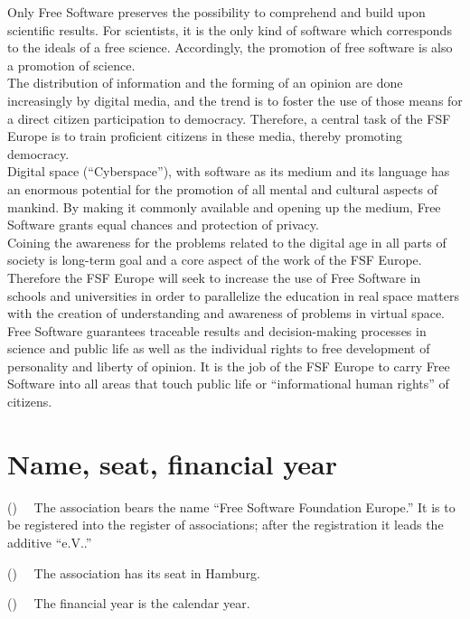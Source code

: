 \documentclass[a4wide,12pt]{article}
\newcounter{absatz}[section]
\newcommand{\A}{\par\vspace{1ex}
                \stepcounter{absatz}\noindent(\arabic{absatz})~~}
\begin{document}
Only Free Software preserves the possibility to comprehend and build
upon scientific results. For scientists, it is the only kind of
software which corresponds to the ideals of a free
science. Accordingly, the promotion of free software is also a
promotion of science.\\

The distribution of information and the forming of an opinion are done
increasingly by digital media, and the trend is to foster the use of
those means for a direct citizen participation to
democracy. Therefore, a central task of the FSF Europe is to train
proficient citizens in these media, thereby promoting democracy.\\

Digital space (``Cyberspace''), with software as its medium and its
language has an enormous potential for the promotion of all mental and
cultural aspects of mankind. By making it commonly available and
opening up the medium, Free Software grants equal chances and
protection of privacy.\\

Coining the awareness for the problems related to the digital age in
all parts of society is long-term goal and a core aspect of the work
of the FSF Europe.\\

Therefore the FSF Europe will seek to increase the use of Free
Software in schools and universities in order to parallelize the
education in real space matters with the creation of understanding and
awareness of problems in virtual space.\\

Free Software guarantees traceable results and decision-making
processes in science and public life as well as the individual rights
to free development of personality and liberty of opinion. It is the
job of the FSF Europe to carry Free Software into all areas that touch
public life or ``informational human rights'' of citizens.\\



\section{Name, seat, financial year} 
\A 
The association bears the name ``Free Software Foundation Europe.''  It
is to be registered into the register of associations; after the
registration it leads the additive ``e.V..''
\A 
The association has its seat in Hamburg.  
\A
The financial year is the calendar year.
\end{document}
